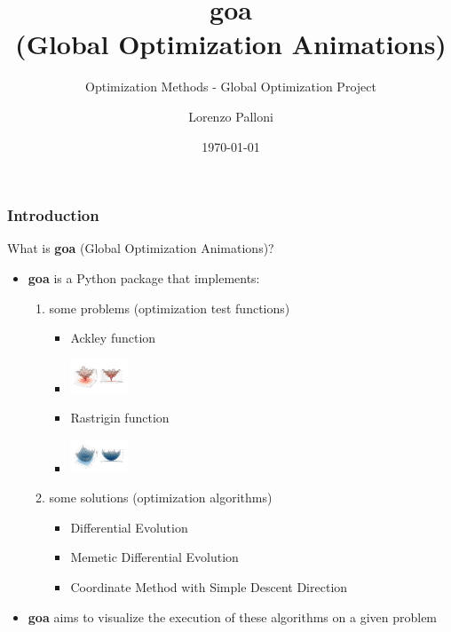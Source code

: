 \documentclass{beamer}
\title[OM - 2021/22 - Lorenzo Palloni]{goa\\ (Global Optimization Animations)}
\subtitle{Optimization Methods - Global Optimization Project}
\author{Lorenzo Palloni}
\institute[]{
  University of Florence\\
  \medskip
  \textit{lorenzo.palloni@stud.unifi.it}
}
\date{\today}
\begin{document}
\begin{frame}
\titlepage %
\end{frame}

\begin{frame}
\frametitle{Introduction}
  What is \textbf{goa} (Global Optimization Animations)?
  \begin{itemize}
    \item \textbf{goa} is a Python package that implements:
    \begin{enumerate}
      \item some problems (optimization test functions)
     \begin{itemize}
       \item Ackley function
       \item[] \includegraphics[width=0.15\textwidth]{figures/introduction-ackley}
       \item Rastrigin function
       \item[] \includegraphics[width=0.15\textwidth]{figures/introduction-rastrigin}
     \end{itemize}
      \item some solutions (optimization algorithms)
      \begin{itemize}
        \item Differential Evolution \cite{de-original}
        \item Memetic Differential Evolution \cite{mde-2021}
        \item Coordinate Method with Simple Descent Direction \cite{textbook}
      \end{itemize}
    \end{enumerate}
    \item \textbf{goa} aims to visualize the execution of these algorithms on a given problem
  \end{itemize}
\end{frame}
\end{document}
